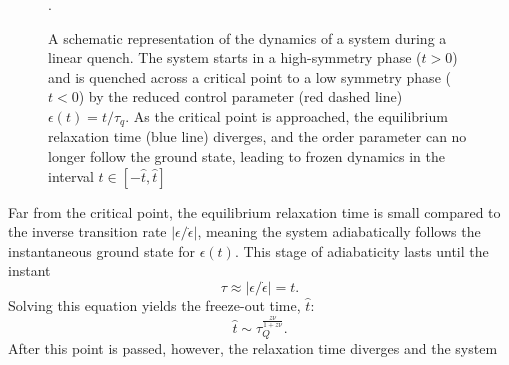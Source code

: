 \begin{figure}
    \centering
    \caption{A schematic representation of the dynamics of a system during a
    linear quench. The system starts in a high-symmetry phase (\( t > 0 \)) and
    is quenched across a critical point to a low symmetry phase (\( t < 0 \)) by
    the reduced control parameter (red dashed line) \( \epsilon(t) = t/\tau_q \).
    As the critical point is approached, the equilibrium relaxation time
    (blue line) diverges, and the order parameter can no longer follow the 
    ground state, leading to frozen dynamics in the interval
    \( t \in [-\hat{t}, \hat{t}] \)}.\label{fig: adiabatic-impulse}
\end{figure}
Far from the critical point, the equilibrium relaxation time is small compared
to the inverse transition rate \( |\epsilon/\dot{\epsilon}| \), meaning the system
adiabatically follows the instantaneous ground state for \( \epsilon(t) \).
This stage of adiabaticity lasts until the instant
\begin{equation}
    \tau \approx |\epsilon/\dot{\epsilon}|=t.
    \label{eq: freeze-out-equal}
\end{equation}
Solving this equation yields the freeze-out time, \( \hat{t} \):
\begin{equation}
    \hat{t} \sim \tau_Q^\frac{z\nu}{1 + z\nu}.
    \label{eq: freeze-out-scaling}
\end{equation}
After this point is passed, however, the relaxation time diverges and the system
